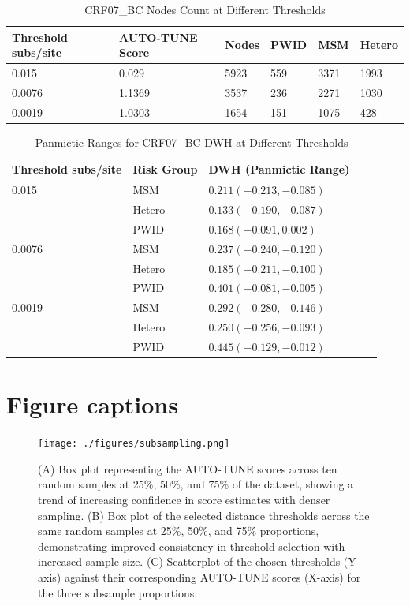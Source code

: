 \documentclass[utf8]{FrontiersinHarvard} %
\begin{document}
\begin{table}[h!]
	\caption{CRF07\_BC Nodes Count at Different Thresholds}
	\label{table:combined}
	\centering
	\begin{tabularx}{\textwidth}{|X|X|X|X|X|X|}
		\hline
		Threshold subs/site & AUTO-TUNE Score & Nodes & PWID & MSM  & Hetero \\
		\hline
		0.015     & 0.029           & 5923  & 559  & 3371 & 1993   \\
		0.0076    & 1.1369          & 3537  & 236  & 2271 & 1030   \\
		0.0019    & 1.0303          & 1654  & 151  & 1075 & 428    \\
		\hline
	\end{tabularx}
\end{table}

\begin{table}[h!]
	\caption{Panmictic Ranges for CRF07\_BC DWH at Different Thresholds}
	\label{table:panmictic}
	\centering
	\begin{tabular}{lllll}
		\hline
		Threshold subs/site & Risk Group & DWH   (Panmictic Range)   \\
		\hline
		0.015     & MSM        & $0.211  (-0.213, -0.085)$ \\
		          & Hetero     & $0.133 (-0.190, -0.087)$  \\
		          & PWID       & $0.168 (-0.091, 0.002)$   \\
		\hline
		0.0076    & MSM        & $0.237 (-0.240, -0.120)$  \\
		          & Hetero     & $0.185 (-0.211, -0.100)$  \\
		          & PWID       & $0.401 (-0.081, -0.005)$  \\
		\hline
		0.0019    & MSM        & $0.292 (-0.280, -0.146)$  \\
		          & Hetero     & $0.250 (-0.256, -0.093)$  \\
		          & PWID       & $0.445 (-0.129, -0.012)$  \\
		\hline
	\end{tabular}
\end{table}

\clearpage

\section{Figure captions}

\begin{figure}[h!]
	\centering
	\texttt{[image: ./figures/subsampling.png]}
	\caption{ (A) Box plot representing the AUTO-TUNE scores across ten random
		samples at 25\%, 50\%, and 75\% of the \citep{rhee_national_2019} dataset,
		showing a trend of increasing confidence in score estimates with denser
		sampling. (B) Box plot of the selected distance thresholds across the same
		random samples at 25\%, 50\%, and 75\% proportions, demonstrating improved
		consistency in threshold selection with increased sample size. (C)
		Scatterplot of the chosen thresholds (Y-axis) against their corresponding
		AUTO-TUNE scores (X-axis) for the three subsample proportions.
	}\label{fig:subsampling}
\end{figure}
\end{document}
